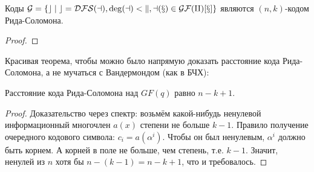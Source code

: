 \begin{theorem}
	Коды $\cal G = \{ c \mid c = DFS(a), \deg (a) < k, a(x) \in GF(q)[x] \}$
	являются $(n,k)$-кодом Рида-Соломона.
\end{theorem}
\begin{proof}
	\TODO
\end{proof}

Красивая теорема, чтобы можно было напрямую доказать расстояние кода Рида-Соломона,
а не мучаться с Вандермондом (как в БЧХ):
\begin{theorem}
	Расстояние кода Рида-Соломона над $GF(q)$ равно $n-k+1$.
\end{theorem}
\begin{proof}
	Доказательство через спектр: возьмём какой-нибудь
	ненулевой информационный многочлен $a(x)$ степени не больше $k-1$.
	Правило получение очередного кодового символа: $c_i=a(\alpha^i)$.
	Чтобы он был ненулевым, $\alpha^i$ должно быть корнем.
	А корней в поле не больше, чем степень, т.е. $k-1$.
	Значит, ненулей из $n$ хотя бы $n-(k-1)=n-k+1$, что и требовалось.
\end{proof}
